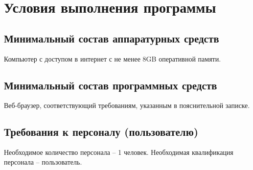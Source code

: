 \section{Условия выполнения программы}

\subsection{Минимальный состав аппаратурных средств}

Компьютер с доступом в интернет с не менее 8GB оперативной памяти.

\subsection{Минимальный состав программных средств}

Веб-браузер, соответствующий требованиям, указанным в пояснительной записке.

\subsection{Требования к персоналу (пользователю)}

Необходимое количество персонала – 1 человек. 
Необходимая квалификация персонала – пользователь. 